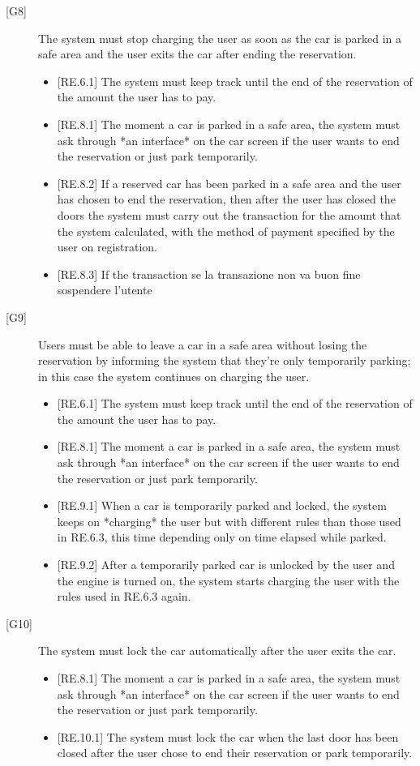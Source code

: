 \documentclass[english]{article}
\begin{document}
\begin{description}
\item[{[G8]}]{The system must stop charging the user as soon as the car is parked in a safe area and the user exits the car after ending the reservation.
\begin{itemize}
	\item{[RE.6.1] The system must keep track until the end of the reservation of the amount the user has to pay.}
	\item{[RE.8.1] The moment a car is parked in a safe area, the system must ask through *an interface* on the car screen if the user wants to end the reservation or just park temporarily.}
	\item{[RE.8.2] If a reserved car has been parked in a safe area and the user has chosen to end the reservation, then after the user has closed the doors the system must carry out the transaction for the amount that the system calculated, with the method of payment specified by the user on registration.}
	\item{[RE.8.3] If the transaction} se la transazione non va buon fine sospendere l'utente
\end{itemize}
}

\item[{[G9]}]{Users must be able to leave a car in a safe area without losing the reservation by informing the system that they’re only temporarily parking; in this case the system continues on charging the user.
\begin{itemize}
	\item{[RE.6.1] The system must keep track until the end of the reservation of the amount the user has to pay.}
	\item{[RE.8.1] The moment a car is parked in a safe area, the system must ask through *an interface* on the car screen if the user wants to end the reservation or just park temporarily.}
	\item{[RE.9.1] When a car is temporarily parked and locked, the system keeps on *charging* the user but with different rules than those used in RE.6.3, this time depending only on time elapsed while parked.}
	\item{[RE.9.2] After a temporarily parked car is unlocked by the user and the engine is turned on, the system starts charging the user with the rules used in RE.6.3 again.}
\end{itemize}
}

\item[{[G10]}]{The system must lock the car automatically after the user exits the car.
\begin{itemize}
	\item{[RE.8.1] The moment a car is parked in a safe area, the system must ask through *an interface* on the car screen if the user wants to end the reservation or just park temporarily.}
	\item{[RE.10.1] The system must lock the car when the last door has been closed after the user chose to end their reservation or park temporarily.}
\end{itemize}
}


\end{description}
\end{document}
